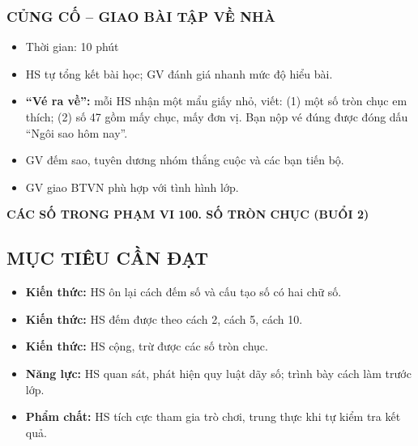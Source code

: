 \documentclass[../main.tex]{subfiles}
\begin{document}
\subsubsection{CỦNG CỐ -- GIAO BÀI TẬP VỀ NHÀ}
\begin{hd}
    \begin{itemize}
        \item Thời gian: 10 phút
        \item HS tự tổng kết bài học; GV đánh giá nhanh mức độ hiểu bài.
    \end{itemize}
\end{hd}
\begin{itemize}
    \item \textbf{“Vé ra về”:} mỗi HS nhận một mẩu giấy nhỏ, viết: (1) một số tròn chục em thích; (2) số 47 gồm mấy chục, mấy đơn vị. Bạn nộp vé đúng được đóng dấu “Ngôi sao hôm nay”.
    \item GV đếm sao, tuyên dương nhóm thắng cuộc và các bạn tiến bộ.
    \item GV giao BTVN phù hợp với tình hình lớp.
\end{itemize}

\newpage
\setcounter{subsection}{0}
\begin{center}
        {\color{mauchinh!120}\bfseries\Large CÁC SỐ TRONG PHẠM VI 100. SỐ TRÒN CHỤC (BUỔI 2)}
\end{center}

\subsection{MỤC TIÊU CẦN ĐẠT}
\begin{itemize}
    \item \textbf{Kiến thức:} HS ôn lại cách đếm số và cấu tạo số có hai chữ số.
    \item \textbf{Kiến thức:} HS đếm được theo cách 2, cách 5, cách 10.
    \item \textbf{Kiến thức:} HS cộng, trừ được các số tròn chục.
    \item \textbf{Năng lực:} HS quan sát, phát hiện quy luật dãy số; trình bày cách làm trước lớp.
    \item \textbf{Phẩm chất:} HS tích cực tham gia trò chơi, trung thực khi tự kiểm tra kết quả.
\end{itemize}
\end{document}
